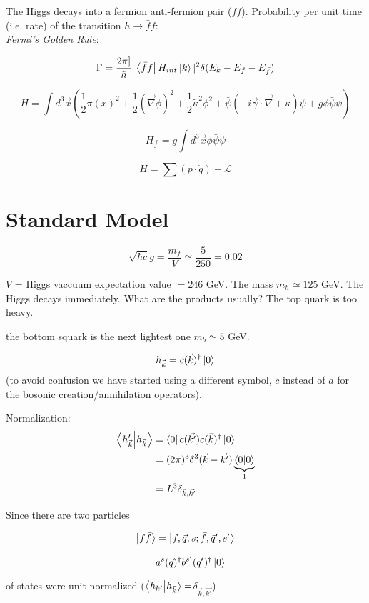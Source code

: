 \documentclass[11pt]{article}
\newcommand{\lag}{\mathcal{L}}
\begin{document}
		
		The Higgs decays into a fermion anti-fermion pair ($f\bar{f}$). Probability per unit time (i.e. rate) of the transition $h \to \bar{f} f$:\\
		\textit{Fermi's Golden Rule}:
		
				\[ \Gamma = \frac{2\pi]}{\hbar} |\bra{\bar{f}f}H_{int}\ket{k}|^2 \delta(E_k - E_f - E_{\bar{f}})\]
				
				\[ H = \int d^3\vec{x}  \left(  \frac{1}{2}\pi(x)^2 + \frac{1}{2}(\vec{\nabla}\phi)^2 + \frac{1}{2}\tilde{\kappa}^2\phi^2 + \bar{\psi}(-i\vec{\gamma}\cdot \vec{\nabla} + \kappa)\psi + g\phi\bar{\psi}\psi \right) \]
	
	
				\[ H_{\int} = g\int d^3\vec{x} \phi\bar{\psi}\psi \]
				
				\[ H = \sum(p\cdot \dot{q}) - \lag \]
				
		\section*{Standard Model}
		
		\[ \sqrt{\hbar c} g = \frac{m_f}{V} \simeq \frac{5}{250} = 0.02\]
		
		$V$ = Higgs vaccuum expectation value $=246$ GeV. The mass $m_h \simeq 125$ GeV. The Higgs decays immediately. What are the products usually? The top quark is too heavy.\
		
		 the bottom squark is the next lightest one $m_b \simeq 5$ GeV.
		 
		 \[ h_{\vec{k}} = c(\vec{k})^\dagger \ket{0} \] (to avoid confusion we have started using a different symbol, $c$ instead of $a$ for the bosonic creation/annihilation operators).
		 
		 Normalization: \begin{align*}
		 	\bra{h_{\vec{k}}'}\ket{h_{\vec{k}}} &= \bra{0} c(\vec{k'})  c(\vec{k})^\dagger \ket{0}\\
		 	& = (2\pi)^3 \delta^3 (\vec{k} - \vec{k'}) \underbrace{\bra{0}\ket{0}}_{1}\\
		 	& = L^3\delta_{\vec{k}, \vec{k'}}
		 \end{align*}
		 
		 Since there are two particles 
		 
		 \[ \ket{f \bar{f}} = \ket{f,\vec{q},s; \bar{f}, \vec{q}', s'} \]
		 
		 		\[ = a^s(\vec{q})^\dagger b^{s'} (\vec{q}')^\dagger \ket{0}\]
		 		
		 		of states were unit-normalized ($\bra{h_{k'}} \ket{h_{\vec{k}}} = $$\delta_{\vec{k}, \vec{k'}}$)
		 		
\end{document}
